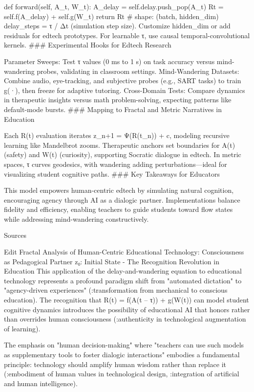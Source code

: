     def forward(self, A_t, W_t):
        A_delay = self.delay.push_pop(A_t)
        Rt = self.f(A_delay) + self.g(W_t)
        return Rt  # shape: (batch, hidden_dim)
delay_steps = τ / Δt (simulation step size).
Customize hidden_dim or add residuals for edtech prototypes.
For learnable τ, use causal temporal-convolutional kernels.
### Experimental Hooks for Edtech Research

Parameter Sweeps: Test τ values (0 ms to 1 s) on task accuracy versus mind-wandering probes, validating in classroom settings.
Mind-Wandering Datasets: Combine audio, eye-tracking, and subjective probes (e.g., SART tasks) to train g(·), then freeze for adaptive tutoring.
Cross-Domain Tests: Compare dynamics in therapeutic insights versus math problem-solving, expecting patterns like default-mode bursts.
### Mapping to Fractal and Metric Narratives in Education

Each R(t) evaluation iterates z_{n+1} = Ψ(R(t_n)) + c, modeling recursive learning like Mandelbrot zooms.
Therapeutic anchors set boundaries for A(t) (safety) and W(t) (curiosity), supporting Socratic dialogue in edtech.
In metric spaces, τ curves geodesics, with wandering adding perturbations—ideal for visualizing student cognitive paths.
### Key Takeaways for Educators

This model empowers human-centric edtech by simulating natural cognition, encouraging agency through AI as a dialogic partner. Implementations balance fidelity and efficiency, enabling teachers to guide students toward flow states while addressing mind-wandering constructively.

Sources

Edit
Fractal Analysis of Human-Centric Educational Technology: Consciousness as Pedagogical Partner
z₀: Initial State - The Recognition Revolution in Education
This application of the delay-and-wandering equation to educational technology represents a profound paradigm shift from "automated dictation" to "agency-driven experiences" (:transformation from mechanical to conscious education). The recognition that R(t) = f(A(t – τ)) + g(W(t)) can model student cognitive dynamics introduces the possibility of educational AI that honors rather than overrides human consciousness (:authenticity in technological augmentation of learning).

The emphasis on "human decision-making" where "teachers can use such models as supplementary tools to foster dialogic interactions" embodies a fundamental principle: technology should amplify human wisdom rather than replace it (:embodiment of human values in technological design, :integration of artificial and human intelligence).

